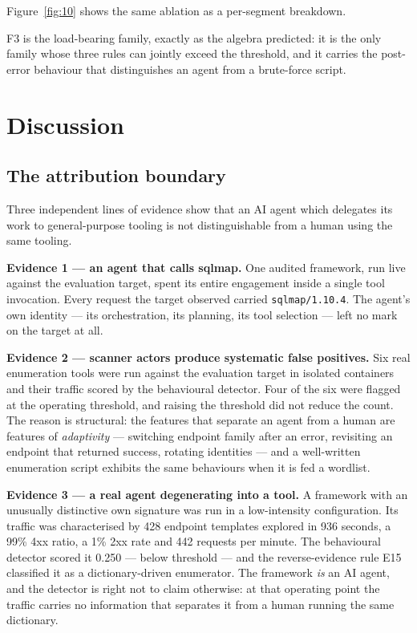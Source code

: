 \documentclass[11pt]{article}
\begin{document}
Figure~\ref{fig:10} shows the same ablation as a per-segment breakdown.

F3 is the load-bearing family, exactly as the algebra predicted: it is the only family whose
three rules can jointly exceed the threshold, and it carries the post-error behaviour that
distinguishes an agent from a brute-force script.

\section{Discussion}
\label{sec:discussion}

\subsection{The attribution boundary}
\label{sec:boundary}

Three independent lines of evidence show that an AI agent which delegates its work to
general-purpose tooling is not distinguishable from a human using the same tooling.

\textbf{Evidence 1 --- an agent that calls sqlmap.} One audited framework, run live against
the evaluation target, spent its entire engagement inside a single tool invocation. Every
request the target observed carried \texttt{sqlmap/1.10.4}. The agent's own identity --- its
orchestration, its planning, its tool selection --- left no mark on the target at all.

\textbf{Evidence 2 --- scanner actors produce systematic false positives.} Six real enumeration
tools were run against the evaluation target in isolated containers and their traffic scored by
the behavioural detector. Four of the six were flagged at the operating threshold, and raising
the threshold did not reduce the count. The reason is structural: the features that separate an
agent from a human are features of \emph{adaptivity} --- switching endpoint family after an
error, revisiting an endpoint that returned success, rotating identities --- and a
well-written enumeration script exhibits the same behaviours when it is fed a wordlist.

\textbf{Evidence 3 --- a real agent degenerating into a tool.} A framework with an unusually
distinctive own signature was run in a low-intensity configuration. Its traffic was
characterised by 428 endpoint templates explored in 936 seconds, a 99\% 4xx ratio, a 1\% 2xx
rate and 442 requests per minute. The behavioural detector scored it 0.250 --- below threshold
--- and the reverse-evidence rule E15 classified it as a dictionary-driven enumerator. The
framework \emph{is} an AI agent, and the detector is right not to claim otherwise: at that
operating point the traffic carries no information that separates it from a human running the
same dictionary.
\end{document}
